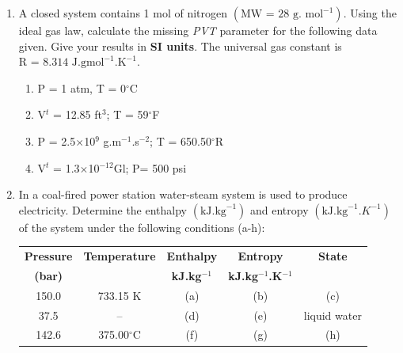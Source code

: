 \documentclass[12pts,a4paper,amsmath,amssymb,floatfix]{article}%
\begin{document}
\begin{enumerate}[label=\bfseries Problem \arabic*:]

\item\label{Tut01:UnitConversion} A closed system contains 1 mol of nitrogen $\left(\text{MW = 28 g. mol}^{-1}\right)$. Using the ideal gas law, calculate the missing {\it PVT} parameter for the following data given. Give your results in {\bf SI units}. The universal gas constant is $\text{R = 8.314 J.gmol}^{-1}\text{.K}^{-1}$.
\begin{enumerate}   
\item P = 1 atm, T = 0$^{\circ}$C
\item V$^{t}$ = 12.85 ft$^{3}$; T = 59$^{\circ}$F
\item P = 2.5$\times$10$^{9}$ g.m$^{-1}$.s$^{-2}$; T = 650.50$^{\circ}$R
\item V$^{t}$ = 1.3$\times$10$^{-12}$Gl; P= 500 psi
\end{enumerate}


\item\label{Tut01:LinearInterpolation} In a coal-fired power station water-steam system is used to produce electricity. Determine the enthalpy $\left(\text{kJ.kg}^{-1}\right)$ and entropy $\left(\text{kJ.kg}^{-1}.K^{-1}\right)$ of the system under the following conditions (a-h):
\begin{center}
\begin{tabular}{||c | c |  c  c | c ||}
\hline\hline
{\bf Pressure}  & {\bf Temperature}  & {\bf Enthalpy}      & {\bf Entropy}               &   {\bf State} \\
{\bf (bar)}     &                    & {\bf kJ.kg$^{-1}$}   & {\bf kJ.kg$^{-1}$.K$^{-1}$}  &               \\
\hline
 150.0          &    733.15 K        &     (a)             &     (b)                     &   (c)         \\
  37.5          &     --             &     (d)             &     (e)                     &   liquid water \\
 142.6          &    375.00$^{\circ}$C&     (f)             &     (g)                     &   (h)         \\  
\hline\hline
\end{tabular}
\end{center} 



\end{enumerate}
\end{document}
